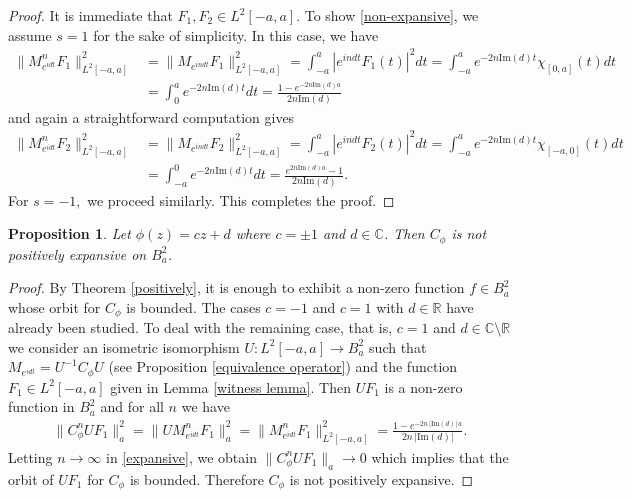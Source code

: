 \documentclass[11pt]{amsart}%
\numberwithin{equation}{section}
\theoremstyle{plain}
\newtheorem{prop}[thm]{Proposition}
\theoremstyle{definition}
\theoremstyle{definition}
\begin{document}
\begin{proof}
It is immediate that $F_1,F_2\in L^2[-a,a].$ To show \eqref{non-expansive}, we assume  $s=1$ for the sake of simplicity.  In this case, we have
\begin{align*}
\|M^n_{e^{idt}}F_1\|_{L^2[-a,a]}^2&=\|M_{e^{indt}}F_1\|_{L^2[-a,a]}^2=\int^a_{-a}|e^{indt}F_1(t)|^2dt=\int^a_{-a}e^{-2n\mathrm{Im}(d)t}\chi_{[0,a]}(t)dt\\
&=\int_0^ae^{-2n\mathrm{Im}(d)t}dt=\frac{1-e^{-2n\mathrm{Im}(d)a}}{2n\mathrm{Im}(d)}
\end{align*}
and again a straightforward computation gives
\begin{align*}
\|M^n_{e^{idt}}F_2\|_{L^2[-a,a]}^2&=\|M_{e^{indt}}F_2\|_{L^2[-a,a]}^2=\int^a_{-a}|e^{indt}F_2(t)|^2dt=\int^a_{-a}e^{-2n\mathrm{Im}(d)t}\chi_{[-a,0]}(t)dt\\
&=\int^0_{-a}e^{-2n\mathrm{Im}(d)t}dt=\frac{e^{2n\mathrm{Im}(d)a}-1}{2n\mathrm{Im}(d)}.
\end{align*}
For $s=-1,$ we proceed similarly. This completes the proof.
\end{proof}





\begin{prop}\label{third estimate}
Let $\phi(z)=cz+d$ where $c=\pm1$ and $d\in\mathbb{C}$. Then $C_{\phi}$ is not positively expansive on $B^2_a$.
\end{prop}

\begin{proof}
By Theorem \ref{positively}, it is enough to exhibit a non-zero function $f\in B_a^2$ whose orbit for $C_{\phi}$ is bounded. The cases $c=-1$ and  $c=1$ with $d\in\mathbb{R}$ have already been studied. To deal with the remaining case, that is, $c=1$ and $d\in\mathbb{C}\setminus\mathbb{R}$ we consider an isometric isomorphism $U:L^2[-a,a]\to B^2_a$ such that $M_{e^{idt}}=U^{-1}C_{\phi}U$ (see Proposition \ref{equivalence operator}) and the function $F_1\in L^2[-a,a]$ given in Lemma \ref{witness lemma}. Then $UF_1$ is a non-zero function in $B^2_a$ and for all $n$ we have
\begin{align}\label{expansive}
\|C_{\phi}^nUF_1\|_a^2=\|UM_{e^{idt}}^nF_1\|_{a}^2=\|M_{e^{idt}}^nF_1\|_{L^2[-a,a]}^2=\frac{1-e^{-2n\,|\mathrm{Im}(d)|\,a}}{2n\,|\mathrm{Im}(d)|}.
\end{align}
Letting $n\to \infty$ in \eqref{expansive}, we obtain $\|C_{\phi}^nUF_1\|_a\to 0$ which implies that the orbit of $UF_1$ for  $C_{\phi}$ is bounded. Therefore $C_{\phi}$ is not positively expansive.
\end{proof}
\end{document}
